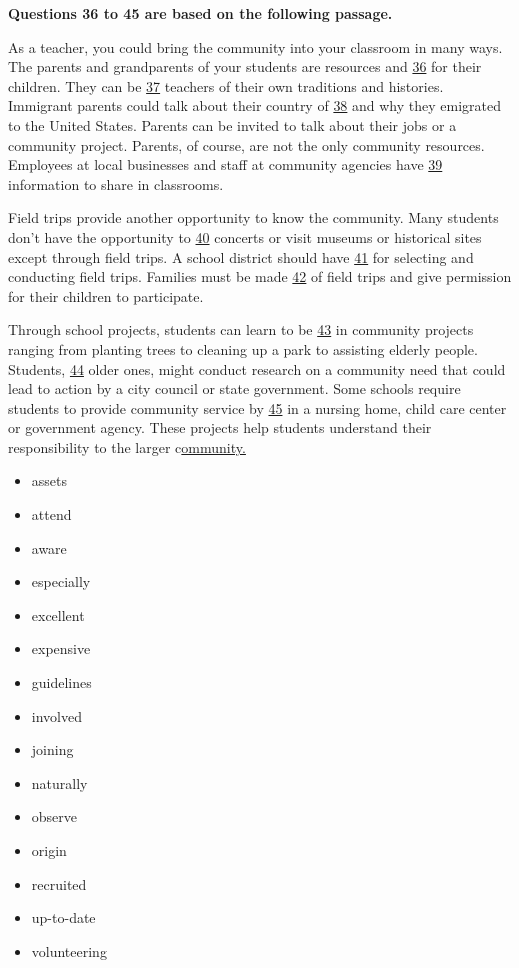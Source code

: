 \documentclass[UTF8,11pt]{ctexart}
\begin{document}
\textbf{Questions 36 to 45 are based on the following passage.}


As a teacher, you could bring the community into your classroom in many ways. The parents and grandparents of your students are resources and \uline{36} for their children. They can be \uline{37} teachers of their own traditions and histories. Immigrant parents could talk about their country of \uline{38} and why they emigrated to the United States. Parents can be invited to talk about their jobs or a community project. Parents, of course, are not the only community resources. Employees at local businesses and staff at community agencies have \uline{39} information to share in classrooms.


Field trips provide another opportunity to know the community. Many students don’t have the opportunity to \uline{40} concerts or visit museums or historical sites except through field trips. A school district should have \uline{41} for selecting and conducting field trips. Families must be made \uline{42} of field trips and give permission for their children to participate.


Through school projects, students can learn to be \uline{43} in community projects ranging from planting trees to cleaning up a park to assisting elderly people. Students, \uline{44} older ones, might conduct research on a community need that could lead to action by a city council or state government. Some schools require students to provide community service by \uline{45} in a nursing home, child care center or government agency. These projects help students understand their responsibility to the larger c\uline{ommunity.}


\begin{itemize}[leftmargin=2em,itemsep=.2em,topsep=.4em]\item[A.] assets
\item[B.] attend
\item[C.] aware
\item[D.] especially
\item[E.] excellent
\item[F.] expensive
\item[G.] guidelines
\item[H.] involved
\item[I.] joining
\item[J.] naturally
\item[K.] observe
\item[L.] origin
\item[M.] recruited
\item[N.] up-to-date
\item[O.] volunteering
\end{itemize}
\end{document}
